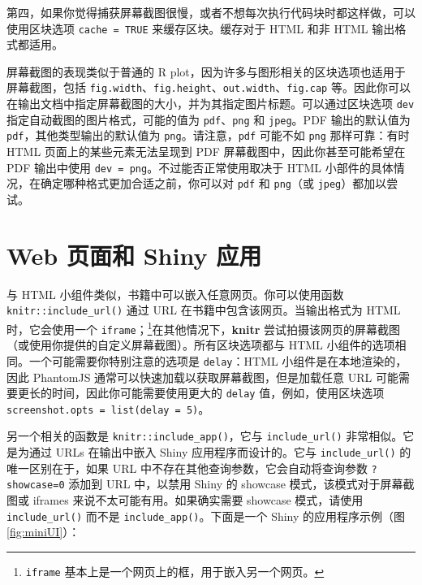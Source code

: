 \documentclass[
  12pt,
]{krantz}
\let\oldhref\href
\renewcommand{\href}[2]{#2\footnote{\url{#1}}}
\theoremstyle{definition}
\theoremstyle{definition}
\theoremstyle{definition}
\theoremstyle{definition}
\theoremstyle{remark}
\begin{document}
第四，如果你觉得捕获屏幕截图很慢，或者不想每次执行代码块时都这样做，可以使用区块选项 \texttt{cache\ =\ TRUE} 来缓存区块。缓存对于 HTML 和非 HTML 输出格式都适用。

屏幕截图的表现类似于普通的 R plot，因为许多与图形相关的区块选项也适用于屏幕截图，包括 \texttt{fig.width}、\texttt{fig.height}、\texttt{out.width}、\texttt{fig.cap} 等。因此你可以在输出文档中指定屏幕截图的大小，并为其指定图片标题。可以通过区块选项 \texttt{dev} 指定自动截图的图片格式，可能的值为 \texttt{pdf}、\texttt{png} 和 \texttt{jpeg}。PDF 输出的默认值为 \texttt{pdf}，其他类型输出的默认值为 \texttt{png}。请注意，\texttt{pdf} 可能不如 \texttt{png} 那样可靠：有时 HTML 页面上的某些元素无法呈现到 PDF 屏幕截图中，因此你甚至可能希望在 PDF 输出中使用 \texttt{dev\ =\ \textquotesingle{}png\textquotesingle{}}。不过能否正常使用取决于 HTML 小部件的具体情况，在确定哪种格式更加合适之前，你可以对 \texttt{pdf} 和 \texttt{png}（或 \texttt{jpeg}）都加以尝试。

\hypertarget{web-ux9875ux9762ux548c-shiny-ux5e94ux7528}{%
\section{Web 页面和 Shiny 应用}\label{web-ux9875ux9762ux548c-shiny-ux5e94ux7528}}

与 HTML 小组件类似，书籍中可以嵌入任意网页。你可以使用函数 \texttt{knitr::include\_url()} 通过 URL 在书籍中包含该网页。当输出格式为 HTML 时，它会使用一个 \texttt{iframe}；\footnote{\texttt{iframe} 基本上是一个网页上的框，用于嵌入另一个网页。}在其他情况下，\textbf{knitr} 尝试拍摄该网页的屏幕截图（或使用你提供的自定义屏幕截图）。所有区块选项都与 HTML 小组件的选项相同。一个可能需要你特别注意的选项是 \texttt{delay}：HTML 小组件是在本地渲染的，因此 PhantomJS 通常可以快速加载以获取屏幕截图，但是加载任意 URL 可能需要更长的时间，因此你可能需要使用更大的 \texttt{delay} 值，例如，使用区块选项 \texttt{screenshot.opts\ =\ list(delay\ =\ 5)}。

另一个相关的函数是 \texttt{knitr::include\_app()}，它与 \texttt{include\_url()} 非常相似。它是为通过 URLs 在输出中嵌入 Shiny 应用程序而设计的。它与 \texttt{include\_url()} 的唯一区别在于，如果 URL 中不存在其他查询参数，它会自动将查询参数 \texttt{?showcase=0} 添加到 URL 中，以禁用 Shiny 的 showcase 模式，该模式对于屏幕截图或 iframes 来说不太可能有用。如果确实需要 showcase 模式，请使用 \texttt{include\_url()} 而不是 \texttt{include\_app()}。下面是一个 Shiny 的应用程序示例（图 \ref{fig:miniUI}）：

\let\ooldhref\href
\let\href\oldhref
\end{document}

